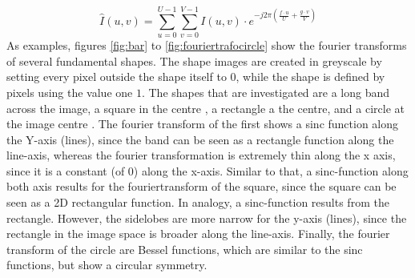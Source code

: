 \begin{equation*}
\hat{I}(u,v)=\sum^{U-1}_{u=0}\sum^{V-1}_{v=0} I\left(u,v\right)\cdot e^{-j2\pi\left(\frac{f\cdot u}{U}+\frac{g\cdot v}{V}\right)}
\end{equation*}
As examples, figures \ref{fig:bar} to \ref{fig:fouriertrafocircle} show the fourier transforms of several fundamental shapes. The shape images are created in greyscale by setting every pixel outside the shape itself to $0$, while the shape is defined by pixels using the value one $1$. The shapes that are investigated are a long band across the image, a square in the centre , a rectangle a the centre, and a circle at the image centre . The fourier transform of the first shows a sinc function along the Y-axis (lines), since the band can be seen as a rectangle function along the line-axis, whereas the fourier transformation is extremely thin along the x axis, since it is a constant (of 0) along the x-axis. Similar to that, a sinc-function along both axis results for the fouriertransform of the square, since the square can be seen as a 2D rectangular function. In analogy, a sinc-function results from the rectangle. However, the sidelobes are more narrow for the y-axis (lines), since the rectangle in the image space is broader along the line-axis. Finally, the fourier transform of the circle are Bessel functions, which are similar to the sinc functions, but show a circular symmetry. 



